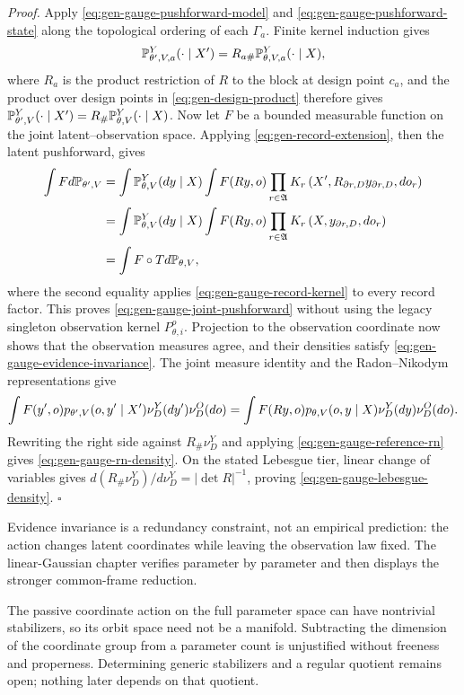 \noindent\emph{Proof.}
Apply \eqref{eq:gen-gauge-pushforward-model} and
\eqref{eq:gen-gauge-pushforward-state} along the topological ordering of each $\Gamma_a$.
Finite kernel induction gives
\[
\mathbb P_{\theta',V,a}^{Y}(\cdot\mid X')
=R_{a\#}\mathbb P_{\theta,V,a}^{Y}(\cdot\mid X),
\]
where $R_a$ is the product restriction of $R$ to the block at design point $c_a$,
and the product over design points in \eqref{eq:gen-design-product} therefore gives
$\mathbb P_{\theta',V}^{Y}(\cdot\mid X')=R_\#\mathbb P_{\theta,V}^{Y}(\cdot\mid X)$.
Now let $F$ be a bounded measurable function on the joint latent--observation space. Applying
\eqref{eq:gen-record-extension}, then the latent pushforward, gives
\[
\begin{split}
\int F d\mathbb P_{\theta',V}
&=\int\mathbb P_{\theta,V}^{Y}(dy\mid X)
\int F(Ry,o)\prod_{r\in\mathfrak A}
K_r\left(X',R_{\partial r,D}y_{\partial r,D},do_r\right)\\
&=\int\mathbb P_{\theta,V}^{Y}(dy\mid X)
\int F(Ry,o)\prod_{r\in\mathfrak A}
K_r\left(X,y_{\partial r,D},do_r\right)\\
&=\int F\circ T d\mathbb P_{\theta,V},
\end{split}
\]
where the second equality applies \eqref{eq:gen-gauge-record-kernel} to every record factor. This
proves \eqref{eq:gen-gauge-joint-pushforward} without using the legacy singleton observation
kernel $P_{\theta,i}^{o}$. Projection to the observation coordinate now shows that the observation
measures agree, and their densities satisfy \eqref{eq:gen-gauge-evidence-invariance}. The joint
measure identity and the Radon--Nikodym representations give
\[
\int F(y',o)p_{\theta',V}(o,y'\mid X')\nu_D^Y(dy')\nu_D^O(do)
=\int F(Ry,o)p_{\theta,V}(o,y\mid X)\nu_D^Y(dy)\nu_D^O(do).
\]
Rewriting the right side against $R_\#\nu_D^Y$ and applying
\eqref{eq:gen-gauge-reference-rn} gives \eqref{eq:gen-gauge-rn-density}. On the stated Lebesgue
tier, linear change of variables gives
$d(R_\#\nu_D^Y)/d\nu_D^Y=|\det R|^{-1}$, proving
\eqref{eq:gen-gauge-lebesgue-density}. \hfill$\square$

Evidence invariance is a redundancy constraint, not an empirical prediction: the action changes
latent coordinates while leaving the observation law fixed.  The linear-Gaussian chapter verifies
 parameter by parameter and then displays the stronger
common-frame reduction.

The passive coordinate action on the full parameter space can have nontrivial
stabilizers, so its orbit space need not be a manifold. Subtracting the
dimension of the coordinate group from a parameter count is unjustified
without freeness and properness. Determining generic stabilizers and a regular
quotient remains open; nothing later depends on that quotient.
\label{open:gen-gauge-quotient}
